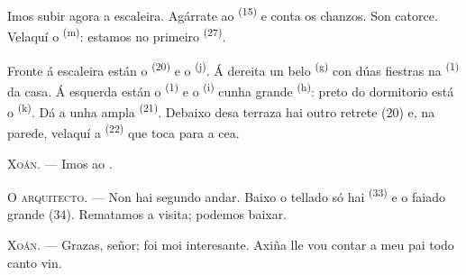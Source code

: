 Imos subir agora a escaleira. Agárrate ao 
\textsuperscript{(15)} e conta os chanzos. Son catorce. Velaquí o 
\textsuperscript{(m)}: estamos no primeiro  \textsuperscript{(27)}.

\VUsaut{3.0mm}
\VUsaut{3.0mm}

Fronte á escaleira están o  \textsuperscript{(20)} e o  \textsuperscript{(j)}. Á dereita un belo 
\textsuperscript{(g)} con dúas fiestras na  \textsuperscript{(1)} da
casa. Á esquerda están o  \textsuperscript{(1)} e o
 \textsuperscript{(i)} cunha grande 
\textsuperscript{(h)}: preto do dormitorio está o 
\textsuperscript{(k)}. Dá a unha ampla  \textsuperscript{(21)}.
Debaixo desa terraza hai outro retrete (20) e, na parede, velaquí a 
\textsuperscript{(22)} que toca para a cea.

\textsc{Xoán}. --- Imos ao .

\textsc{O arquitecto}. --- Non hai segundo andar. Baixo o tellado só hai
 \textsuperscript{(33)} e o faiado grande (34). Rematamos a visita;
podemos baixar.

\textsc{Xoán}. --- Grazas, señor; foi moi interesante. Axiña lle vou contar a meu pai
todo canto vin.
